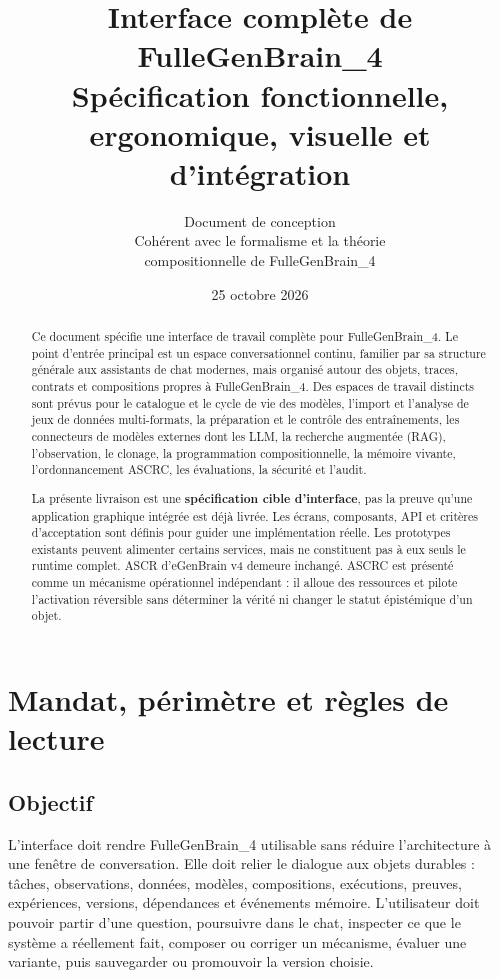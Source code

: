 \documentclass[11pt,a4paper]{article}
\title{\textbf{Interface complète de FulleGenBrain\_4}\\[0.4em]
\large Spécification fonctionnelle, ergonomique, visuelle et d'intégration}
\author{Document de conception\\ Cohérent avec le formalisme et la théorie\\ compositionnelle de FulleGenBrain\_4}
\date{25 octobre 2026}
\begin{document}
\maketitle
\begin{abstract}
Ce document spécifie une interface de travail complète pour FulleGenBrain\_4. Le point d'entrée principal est un espace conversationnel continu, familier par sa structure générale aux assistants de chat modernes, mais organisé autour des objets, traces, contrats et compositions propres à FulleGenBrain\_4. Des espaces de travail distincts sont prévus pour le catalogue et le cycle de vie des modèles, l'import et l'analyse de jeux de données multi-formats, la préparation et le contrôle des entraînements, les connecteurs de modèles externes dont les LLM, la recherche augmentée (RAG), l'observation, le clonage, la programmation compositionnelle, la mémoire vivante, l'ordonnancement ASCRC, les évaluations, la sécurité et l'audit.

La présente livraison est une \textbf{spécification cible d'interface}, pas la preuve qu'une application graphique intégrée est déjà livrée. Les écrans, composants, API et critères d'acceptation sont définis pour guider une implémentation réelle. Les prototypes existants peuvent alimenter certains services, mais ne constituent pas à eux seuls le runtime complet. ASCR d'eGenBrain v4 demeure inchangé. ASCRC est présenté comme un mécanisme opérationnel indépendant : il alloue des ressources et pilote l'activation réversible sans déterminer la vérité ni changer le statut épistémique d'un objet.
\end{abstract}
\tableofcontents
\newpage

\section{Mandat, périmètre et règles de lecture}
\subsection{Objectif}
L'interface doit rendre FulleGenBrain\_4 utilisable sans réduire l'architecture à une fenêtre de conversation. Elle doit relier le dialogue aux objets durables : tâches, observations, données, modèles, compositions, exécutions, preuves, expériences, versions, dépendances et événements mémoire. L'utilisateur doit pouvoir partir d'une question, poursuivre dans le chat, inspecter ce que le système a réellement fait, composer ou corriger un mécanisme, évaluer une variante, puis sauvegarder ou promouvoir la version choisie.
\end{document}
